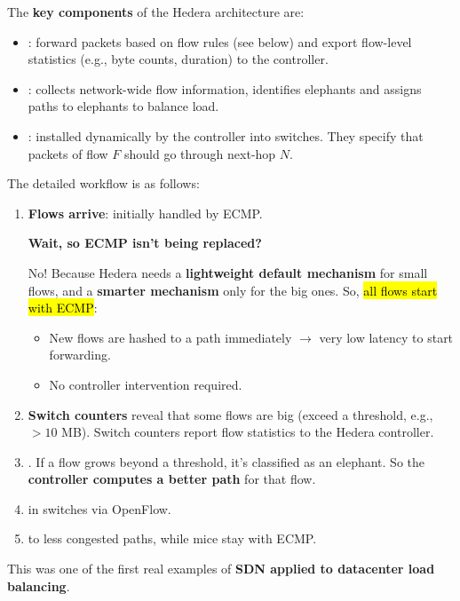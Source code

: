 \highspace
The \textbf{key components} of the Hedera architecture are:
\begin{itemize}
    \item {}: forward packets based on flow rules (see below) and export flow-level statistics (e.g., byte counts, duration) to the controller.
    \item {}: collects network-wide flow information, identifies elephants and assigns paths to elephants to balance load.
    \item {}: installed dynamically by the controller into switches. They specify that packets of flow $F$ should go through next-hop $N$.
\end{itemize}
The detailed workflow is as follows:
\begin{enumerate}
    \item \textbf{Flows arrive}: initially handled by ECMP.

    \begin{flushleft}
        \textcolor{Green3}{ \textbf{Wait, so ECMP isn't being replaced?}}
    \end{flushleft}
    No! Because Hedera needs a \textbf{lightweight default mechanism} for small flows, and a \textbf{smarter mechanism} only for the big ones. So, \hl{all flows start with ECMP}:
    \begin{itemize}
        \item New flows are hashed to a path immediately $\rightarrow$ very low latency to start forwarding.
        \item No controller intervention required.
    \end{itemize}

    \item \textbf{Switch counters} reveal that some flows are big (exceed a threshold, e.g., $>10$ MB). Switch counters report flow statistics to the Hedera controller.

    \item {}. If a flow grows beyond a threshold, it's classified as an elephant. So the \textbf{controller computes a better path} for that flow.

    \item {} in switches via OpenFlow.

    \item {} to less congested paths, while mice stay with ECMP.
\end{enumerate}
This was one of the first real examples of \textbf{SDN applied to datacenter load balancing}.

